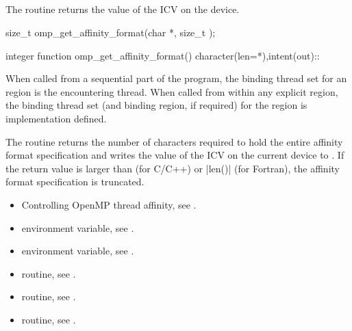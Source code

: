 \subsection{}
\label{subsec:omp_get_affinity_format}

\summary
The  routine returns the value of the 
 ICV on the device.

\format
\begin{ccppspecific}
\begin{ompcFunction}
size_t omp_get_affinity_format(char *, size_t );
\end{ompcFunction}
\end{ccppspecific}

\begin{fortranspecific}
\begin{ompfFunction}
integer function omp_get_affinity_format()
character(len=*),intent(out)::
\end{ompfFunction}
\end{fortranspecific}

\binding
When called from a sequential part of the program, the binding thread set for an 
 region is the encountering thread. When called 
from within any explicit  region, the binding thread set (and binding region, if 
required) for the  region is implementation defined. 

\effect
The  routine returns the number of characters required
to hold the entire affinity format specification and writes the value of the
 ICV on the current device to .
If the return value is larger than  (for C/C++) or {\code|len()|}
(for Fortran), the affinity format specification is truncated.

\crossreferences
\begin{itemize}
\item Controlling OpenMP thread affinity, see 
. 
\item {} environment variable, see 
.
\item {} environment variable, see 
.
\item {} routine, see .
\item {} routine, see .
\item {} routine, see .
\end{itemize}


